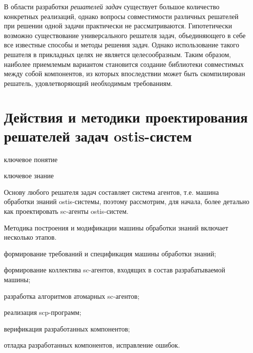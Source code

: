 В области разработки \textit{решателей задач} существует большое количество конкретных реализаций, однако вопросы совместимости различных решателей при решении одной задачи практически не рассматриваются. Гипотетически возможно существование универсального решателя задач, объединяющего в себе все известные способы и методы решения задач. Однако использование такого решателя в прикладных целях не является целесообразным. Таким образом, наиболее приемлемым вариантом становится создание библиотеки совместимых между собой компонентов, из которых впоследствии может быть скомпилирован решатель, удовлетворяющий необходимым требованиям.

\section{Действия и методики проектирования решателей задач ostis-систем}
\begin{SCn}
\bigskip

\begin{scnrelfromlist}{ключевое понятие}
\end{scnrelfromlist}

\bigskip

\begin{scnrelfromlist}{ключевое знание}
\end{scnrelfromlist}
\end{SCn}
\label{sec_ps_design_methodology}

Основу любого решателя задач составляет система агентов, т.е. машина обработки знаний ostis-системы, поэтому рассмотрим, для начала, более детально как проектировать  sc-агенты ostis-систем.

Методика построения и модификации машины обработки знаний включает несколько этапов. 
\begin{textitemize}
    \item формирование требований и спецификация машины обработки знаний;
    \item формирование коллектива sc-агентов, входящих в состав разрабатываемой машины;
    \item разработка алгоритмов атомарных sc-агентов;
    \item реализация scp-программ;
    \item верификация разработанных компонентов;
    \item отладка разработанных компонентов, исправление ошибок.
\end{textitemize}

